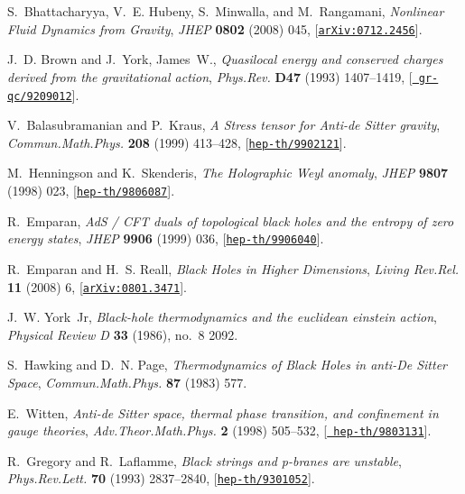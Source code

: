 \documentclass[12pt,a4paper]{article}
\begin{document}
\begin{thebibliography}{100}
S.~Bhattacharyya, V.~E. Hubeny, S.~Minwalla, and M.~Rangamani, {\it {Nonlinear
  Fluid Dynamics from Gravity}},  {\em JHEP} {\bf 0802} (2008) 045,
  [\href{http://xxx.lanl.gov/abs/0712.2456}{{\tt arXiv:0712.2456}}].

J.~D. Brown and J.~York, James~W., {\it {Quasilocal energy and conserved
  charges derived from the gravitational action}},  {\em Phys.Rev.} {\bf D47}
  (1993) 1407--1419, [\href{http://xxx.lanl.gov/abs/gr-qc/9209012}{{\tt
  gr-qc/9209012}}].

V.~Balasubramanian and P.~Kraus, {\it {A Stress tensor for Anti-de Sitter
  gravity}},  {\em Commun.Math.Phys.} {\bf 208} (1999) 413--428,
  [\href{http://xxx.lanl.gov/abs/hep-th/9902121}{{\tt hep-th/9902121}}].

M.~Henningson and K.~Skenderis, {\it {The Holographic Weyl anomaly}},  {\em
  JHEP} {\bf 9807} (1998) 023,
  [\href{http://xxx.lanl.gov/abs/hep-th/9806087}{{\tt hep-th/9806087}}].

R.~Emparan, {\it {AdS / CFT duals of topological black holes and the entropy of
  zero energy states}},  {\em JHEP} {\bf 9906} (1999) 036,
  [\href{http://xxx.lanl.gov/abs/hep-th/9906040}{{\tt hep-th/9906040}}].

R.~Emparan and H.~S. Reall, {\it {Black Holes in Higher Dimensions}},  {\em
  Living Rev.Rel.} {\bf 11} (2008) 6,
  [\href{http://xxx.lanl.gov/abs/0801.3471}{{\tt arXiv:0801.3471}}].

J.~W. York~Jr, {\it Black-hole thermodynamics and the euclidean einstein
  action},  {\em Physical Review D} {\bf 33} (1986), no.~8 2092.

S.~Hawking and D.~N. Page, {\it {Thermodynamics of Black Holes in anti-De
  Sitter Space}},  {\em Commun.Math.Phys.} {\bf 87} (1983) 577.

E.~Witten, {\it {Anti-de Sitter space, thermal phase transition, and
  confinement in gauge theories}},  {\em Adv.Theor.Math.Phys.} {\bf 2} (1998)
  505--532, [\href{http://xxx.lanl.gov/abs/hep-th/9803131}{{\tt
  hep-th/9803131}}].

R.~Gregory and R.~Laflamme, {\it {Black strings and p-branes are unstable}},
  {\em Phys.Rev.Lett.} {\bf 70} (1993) 2837--2840,
  [\href{http://xxx.lanl.gov/abs/hep-th/9301052}{{\tt hep-th/9301052}}].


\end{thebibliography}
\end{document}
